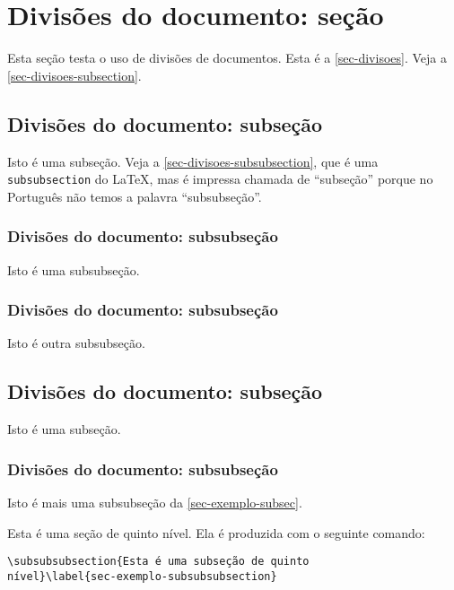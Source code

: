 \section{Divisões do documento: seção}\label{sec-divisoes}

Esta seção testa o uso de divisões de documentos. Esta é a
\autoref{sec-divisoes}. Veja a \autoref{sec-divisoes-subsection}.

\subsection{Divisões do documento: subseção}\label{sec-divisoes-subsection}

Isto é uma subseção. Veja a \autoref{sec-divisoes-subsubsection}, que é uma
\texttt{subsubsection} do \LaTeX, mas é impressa chamada de ``subseção'' porque
no Português não temos a palavra ``subsubseção''.

\subsubsection{Divisões do documento: subsubseção}
\label{sec-divisoes-subsubsection}

Isto é uma subsubseção.

\subsubsection{Divisões do documento: subsubseção}

Isto é outra subsubseção.

\subsection{Divisões do documento: subseção}\label{sec-exemplo-subsec}

Isto é uma subseção.

\subsubsection{Divisões do documento: subsubseção}

Isto é mais uma subsubseção da \autoref{sec-exemplo-subsec}.


\label{sec-exemplo-subsubsubsection}

Esta é uma seção de quinto nível. Ela é produzida com o seguinte comando:

\begin{verbatim}
\subsubsubsection{Esta é uma subseção de quinto
nível}\label{sec-exemplo-subsubsubsection}
\end{verbatim}

